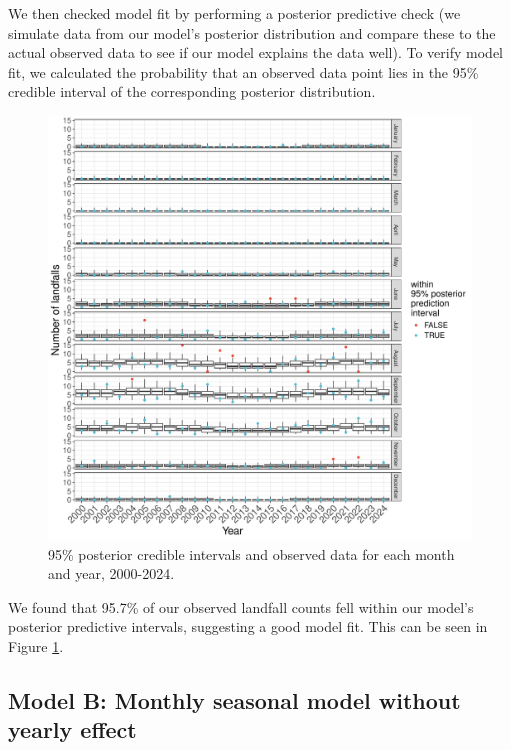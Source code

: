 \documentclass[
]{article}
\begin{document}
We then checked model fit by performing a posterior predictive check (we simulate data from our model's posterior distribution and compare these to the actual observed data to see if our model explains the data well). To verify model fit, we calculated the probability that an observed data point lies in the 95\% credible interval of the corresponding posterior distribution.

\begin{figure}

{\centering \includegraphics[width=1\linewidth]{../outputs/bayesian-analysis-landfall-freq/model-HSGP/HSGP-post-pred-checks} 

}

\caption{95\% posterior credible intervals and observed data for each month and year, 2000-2024.}\label{fig:figs10}
\end{figure}

We found that 95.7\% of our observed landfall counts fell within our model's posterior predictive intervals, suggesting a good model fit. This can be seen in Figure \ref{fig:figs10}.

\newpage

\subsection{Model B: Monthly seasonal model without yearly effect}\label{model-b-monthly-seasonal-model-without-yearly-effect}
\end{document}
